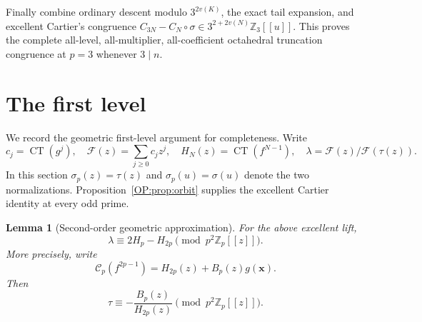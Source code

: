 \documentclass[11pt,a4paper]{article}
\newtheorem{lemma}[theorem]{Lemma}
\theoremstyle{definition}\newtheorem{definition}[theorem]{Definition}
\theoremstyle{remark}\newtheorem{remark}[theorem]{Remark}
\DeclareMathOperator{\CT}{CT}
\numberwithin{equation}{section}
\begin{document}
Finally combine ordinary descent modulo $3^{2v(K)}$, the exact tail
expansion, and excellent Cartier's congruence
$C_{3N}-C_N\circ\sigma\in3^{2+2v(N)}\mathbb Z_3[[u]]$.
This proves the complete all-level, all-multiplier, all-coefficient
octahedral truncation congruence at $p=3$ whenever $3\mid n$.
\section{The first level}\label{OP:source-main-6}\label{OP:sec:first-level}
We record the geometric first-level argument for completeness. Write
\[
c_j=\CT(g^j),\quad \mathcal F(z)=\sum_{j\ge0}c_jz^j,
\quad H_N(z)=\CT(f^{N-1}),\quad
\lambda=\mathcal F(z)/\mathcal F(\tau(z)).
\]
In this section $\sigma_p(z)=\tau(z)$ and $\sigma_p(u)=\sigma(u)$
denote the two normalizations. Proposition~\ref{OP:prop:orbit} supplies
the excellent Cartier identity at every odd prime.
\begin{lemma}[Second-order geometric approximation]
\label{OP:L:lem:second-geometric}
For the above excellent lift,
\[
 \lambda\equiv2H_p-H_{2p}\pmod{p^2\mathbb Z_p[[z]]}.
\]
More precisely, write
\[
 \mathscr C_p(f^{2p-1})=H_{2p}(z)+B_p(z)g(\mathbf{x}).
\]
Then
\[
 \tau\equiv-\frac{B_p(z)}{H_{2p}(z)}\pmod{p^2\mathbb Z_p[[z]]}.
\]
\end{lemma}
\end{document}
